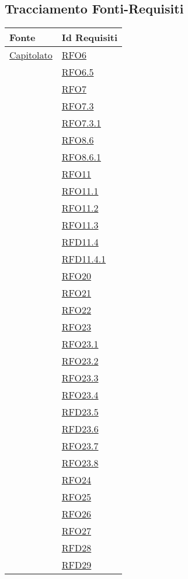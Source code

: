 \subsection{Tracciamento Fonti-Requisiti}
\normalsize
\begin{longtable}{|>{\centering}m{5cm}|m{5cm}<{\centering}|}
\hline 
\textbf{Fonte} & \textbf{Id Requisiti}\\
\hline
\endhead
\hyperlink{Capitolato}{Capitolato} & \hyperlink{RFO6}{RFO6}\\
& \hyperlink{RFO6.5}{RFO6.5}\\
& \hyperlink{RFO7}{RFO7}\\
& \hyperlink{RFO7.3}{RFO7.3}\\
& \hyperlink{RFO7.3.1}{RFO7.3.1}\\
& \hyperlink{RFO8.6}{RFO8.6}\\
& \hyperlink{RFO8.6.1}{RFO8.6.1}\\
& \hyperlink{RFO11}{RFO11}\\
& \hyperlink{RFO11.1}{RFO11.1}\\
& \hyperlink{RFO11.2}{RFO11.2}\\
& \hyperlink{RFO11.3}{RFO11.3}\\
& \hyperlink{RFD11.4}{RFD11.4}\\
& \hyperlink{RFD11.4.1}{RFD11.4.1}\\
& \hyperlink{RFO20}{RFO20}\\
& \hyperlink{RFO21}{RFO21}\\
& \hyperlink{RFO22}{RFO22}\\
& \hyperlink{RFO23}{RFO23}\\
& \hyperlink{RFO23.1}{RFO23.1}\\
& \hyperlink{RFO23.2}{RFO23.2}\\
& \hyperlink{RFO23.3}{RFO23.3}\\
& \hyperlink{RFO23.4}{RFO23.4}\\
& \hyperlink{RFD23.5}{RFD23.5}\\
& \hyperlink{RFD23.6}{RFD23.6}\\
& \hyperlink{RFO23.7}{RFO23.7}\\
& \hyperlink{RFO23.8}{RFO23.8}\\
& \hyperlink{RFO24}{RFO24}\\
& \hyperlink{RFO25}{RFO25}\\
& \hyperlink{RFO26}{RFO26}\\
& \hyperlink{RFO27}{RFO27}\\
& \hyperlink{RFD28}{RFD28}\\
& \hyperlink{RFD29}{RFD29}\\

\end{longtable}

